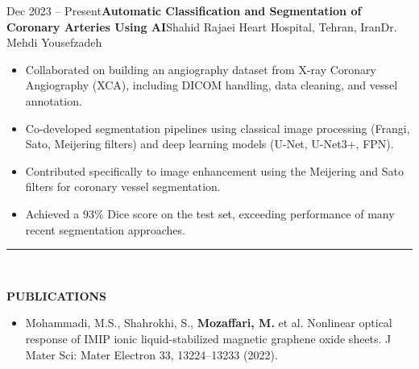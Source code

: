 \documentclass[12pt, b4paper]{cv}
\begin{document}
\begin{research_exp}{Dec 2023 -- Present}{\textbf{Automatic Classification and Segmentation of Coronary Arteries Using AI}}{Shahid Rajaei Heart Hospital, Tehran, Iran}{Dr. Mehdi Yousefzadeh}
\vspace{10pt}
	\begin{itemize}
		\item Collaborated on building an angiography dataset from X-ray Coronary Angiography (XCA), including DICOM handling, data cleaning, and vessel annotation.

		\item Co-developed segmentation pipelines using classical image processing (Frangi, Sato, Meijering filters) and deep learning models (U-Net, U-Net3+, FPN).

		\item Contributed specifically to image enhancement using the Meijering and Sato filters for coronary vessel segmentation.

		\item Achieved a 93\% Dice score on the test set, exceeding performance of many recent segmentation approaches.
	\end{itemize}
	
\end{research_exp}


\vspace{-0.15in}
\rule{\textwidth}{1pt}\\
\vspace{-0.15in}

{\Large \textbf{PUBLICATIONS}}
\vspace{-5pt}

\begin{itemize}
	\item Mohammadi, M.S., Shahrokhi, S., \textbf{Mozaffari, M.} et al. Nonlinear optical response of IMIP ionic liquid-stabilized magnetic graphene oxide sheets. J Mater Sci: Mater Electron 33, 13224–13233 (2022).
\end{itemize}




\end{document}
